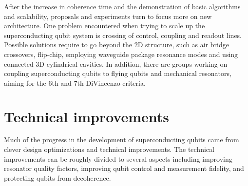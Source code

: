 \documentclass[%
groupedaddress,
showpacs,
 amsmath,amssymb,
 aps,
prb,
]{revtex4-1}
\begin{document}
After the increase in coherence time and the demonstration of basic algorithms and scalability, proposals and experiments turn to focus more on new architecture. One problem encountered when trying to scale up the superconducting qubit system is crossing of control, coupling and readout lines. Possible solutions require to go beyond the 2D structure, such as air bridge crossovers\cite{Versluis2016}, flip-chip\cite{Yorozu2006}, employing waveguide package resonance modes\cite{Minev2016} and using connected 3D cylindrical cavities\cite{Axline2016}. In addition, there are groups working on coupling superconducting qubits to flying qubits and mechanical resonators\cite{Palomaki2013,Reed2017,Keller2017}, aiming for the 6th and 7th DiVincenzo criteria.




\section{Technical improvements} %
\label{sec:technical_improvements}

Much of the progress in the development of superconducting qubits came from clever design optimizations and technical improvements. The technical improvements can be roughly divided to several aspects including improving resonator quality factors, improving qubit control and measurement fidelity, and protecting qubits from decoherence.
\end{document}
